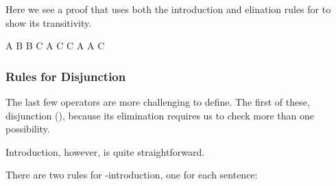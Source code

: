 \begin{fitchrule}
  \label{def:iff-introduction-rule}
  \leavevmode
  \vspace{-0.9\baselineskip}
  \begin{fitchproof}
    \open
     {\ephi}           
     {\epsi}
    \close
    \open
     {\epsi}           
     {\ephi}
    \close
     {\ephi\eiff\epsi} 
  \end{fitchproof}
\end{fitchrule}

Here we see a proof that uses both the introduction and elination rules for
\siff to show its transitivity.

\begin{fitchproof}
   {A \eiff B}        
   {B \eiff C}        
  \open
   {A}                
   {C}                
  \close
   {C}                
   {A}                
  \close
   {A \eiff C}        
\end{fitchproof}

\subsubsection{Rules for Disjunction}

The last few operators are more challenging to define. The first of these,
disjunction (\eor), because its elimination requires us to check more than one
possibility.

Introduction, however, is quite straightforward.

\begin{fitchrule}
  \label{def:eor-introduction-rule}
  \leavevmode
  There are two rules for \eor-introduction, one for each sentence: \\
\end{fitchrule}


